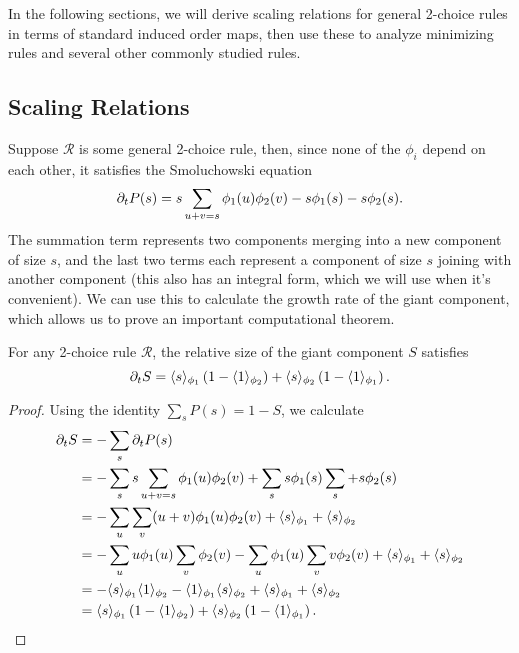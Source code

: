 \documentclass[twoside,10pt]{article}
\begin{document}
In the following sections, we will derive scaling relations for general 2-choice rules in terms of standard induced order maps, then use these to analyze minimizing rules and several other commonly studied rules.

\subsection{Scaling Relations}

Suppose $\mathcal{R}$ is some general 2-choice rule, then, since none of the $\phi_i$ depend on each other, it satisfies the Smoluchowski equation
        \[
                \partial_{t}{P(s)} = s \sum_{u+v=s} \phi_1(u) \phi_2(v) - s \phi_1(s) - s\phi_2(s).
        \]
	The summation term represents two components merging into a new component of size $s$, and the last two terms each represent a component of size $s$ joining with another component (this also has an integral form, which we will use when it's convenient). We can use this to calculate the growth rate of the giant component, which allows us to prove an important computational theorem.

\begin{lem}
        \label{2c-sdelS}
        For any 2-choice rule $\mathcal{R}$, the relative size of the giant component $S$ satisfies
	\[
		\partial_{t}{S} = \langle s \rangle_{\phi_1}\left( 1-\langle 1 \rangle_{\phi_2} \right) + \langle s \rangle_{\phi_2}\left( 1-\langle 1 \rangle_{\phi_1} \right).
	\] 
\end{lem}
\begin{proof}
        Using the identity $\sum_s P(s) = 1-S$, we calculate
        \begin{align*}
                \partial_{t}{S} &= - \sum_s \partial_{t}{P(s)} \\
                          &= - \sum_s s \sum_{u+v=s}\phi_1(u)\phi_2(v) + \sum_s s \phi_1(s) \sum_s + s \phi_2(s) \\
                          &= - \sum_u \sum_v (u+v) \phi_1(u)\phi_2(v) + \langle s \rangle_{\phi_1} + \langle s \rangle_{\phi_2} \\
                          &= -\sum_{u}u \phi_1(u) \sum_{v} \phi_2(v) - \sum_{u}\phi_1(u)\sum_{v}v \phi_2(v) + \langle s \rangle_{\phi_1} + \langle s \rangle_{\phi_2} \\
                          &= -\langle s \rangle_{\phi_1}\langle 1 \rangle_{\phi_2} - \langle 1 \rangle_{\phi_1}\langle s \rangle_{\phi_2} + \langle s \rangle_{\phi_1}+\langle s \rangle_{\phi_2} \\
                          &= \langle s \rangle_{\phi_1}\left( 1-\langle 1 \rangle_{\phi_2} \right) + \langle s \rangle_{\phi_2}\left( 1-\langle 1 \rangle_{\phi_1} \right).
        \end{align*}
\end{proof}
\end{document}
